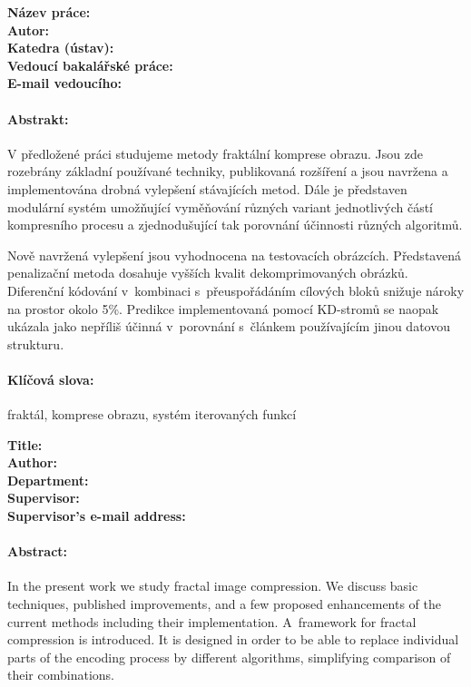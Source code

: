 \cleardoublepage %
{ \small
\noindent
{\bf Název práce:} \bcTitle\\
{\bf Autor:} \bcAuthor\\
{\bf Katedra (ústav):} \bcKSVI\\
{\bf Vedoucí bakalářské práce:} \bcTeacher\\
{\bf E-mail vedoucího:} \bcTeacherMail

\paragraph{Abstrakt:} V předložené práci studujeme metody fraktální komprese obrazu.
Jsou zde rozebrány základní používané techniky, publikovaná rozšíření a jsou navržena a implementována drobná vylepšení stávajících metod. Dále je představen modulární systém umožňující vyměňování různých variant jednotlivých částí kompresního procesu a zjednodušující tak porovnání účinnosti různých algoritmů.

Nově navržená vylepšení jsou vyhodnocena na testovacích obrázcích. Představená penalizační metoda dosahuje vyšších kvalit dekomprimovaných obrázků. Diferenční kódování v~kombinaci s~přeuspořádáním cílových bloků snižuje nároky na prostor okolo 5\%. Predikce implementovaná pomocí KD-stromů se naopak ukázala jako nepříliš účinná v~porovnání s~článkem používajícím jinou datovou strukturu.

\paragraph{Klíčová slova:} fraktál, komprese obrazu, systém iterovaných funkcí

\vfill %

\noindent
{\bf Title:} \bcTitleEn\\
{\bf Author:} \bcAuthor\\
{\bf Department:} \bcKSVIen\\
{\bf Supervisor:} \bcTeacher\\
{\bf Supervisor's e-mail address:} \bcTeacherMail

\paragraph{Abstract:} In the present work we study fractal image compression.
We discuss basic techniques, published improvements, and a few proposed enhancements of the current methods including their implementation. A~framework for fractal compression is introduced. It is designed in order to be able to replace individual parts of the encoding process by different algorithms, simplifying comparison of their combinations.

}
